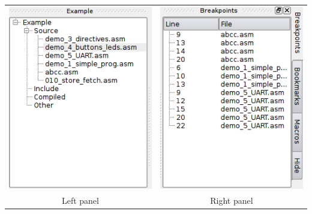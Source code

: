         \begin{table}[h!]
            \centering
            \begin{tabular}{cc}
                \includegraphics[width=.4\textwidth]{img/left_panel.png}
                    &
                \includegraphics[width=.4\textwidth]{img/right_panel.png}
                    \\
                Left panel & Right panel
            \end{tabular}
        \end{table}

